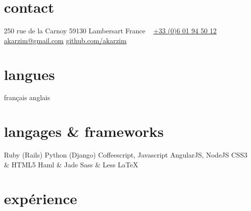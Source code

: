 \documentclass[]{cv} %
\begin{document}


\begin{aside} %
\section{contact}
\faHome{} 250 rue de la Carnoy
59130 Lambersart
France
~
\faPhone{} \href{tel:003360194501}{+33 (0)6 01 94 50 12}
~
\faEnvelope{} \href{mailto:akarzim@gmail.com}{akarzim@gmail.com}
\faGithub{} \href{https://github.com/akarzim}{github.com/akarzim}
\section{langues}
français
anglais
\section{langages \& frameworks}
{\color{red} \faStar} Ruby (Rails)
Python (Django)
Coffeescript, Javascript
AngularJS, NodeJS
CSS3 \& HTML5
Haml \& Jade
Sass \& Less
\LaTeX{}
\end{aside}

\section{expérience}
\end{document}

